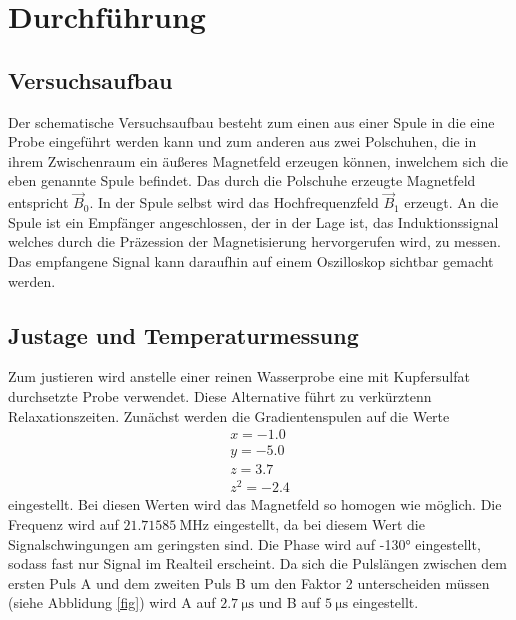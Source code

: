 \section{Durchführung}
\label{sec:Durchführung}

\subsection{Versuchsaufbau}
\label{sec:Versuchsaufbau}

Der schematische Versuchsaufbau besteht zum einen aus einer Spule in die eine Probe 
eingeführt 
werden kann und zum anderen aus zwei Polschuhen, die in ihrem Zwischenraum ein 
äußeres Magnetfeld erzeugen können, inwelchem sich die eben genannte Spule befindet. 
Das durch die Polschuhe erzeugte Magnetfeld entspricht $\vec{B}_{\text{0}}$.
In der Spule selbst wird das Hochfrequenzfeld $\vec{B}_{\text{1}}$ erzeugt.
An die Spule ist ein Empfänger angeschlossen, der in der Lage ist, das Induktionssignal 
welches durch die Präzession der Magnetisierung hervorgerufen wird, zu messen.
Das empfangene Signal kann daraufhin auf einem Oszilloskop sichtbar gemacht werden.

\subsection{Justage und Temperaturmessung}
\label{sec:Justage}

Zum justieren wird anstelle einer reinen Wasserprobe eine mit Kupfersulfat 
durchsetzte Probe verwendet. Diese Alternative führt zu verkürztenn Relaxationszeiten.
Zunächst werden die Gradientenspulen auf die Werte
\begin{align}
    x = -1.0\\
    y = -5.0\\
    z = 3.7\\
    z^2 = -2.4
\end{align}
eingestellt. Bei diesen Werten wird das Magnetfeld so homogen wie möglich.
Die Frequenz wird auf $\SI{21,71585}{\mega\hertz}$ eingestellt,
da bei diesem Wert die Signalschwingungen am geringsten sind. Die Phase wird auf 
-130° eingestellt, sodass fast nur Signal im Realteil erscheint.
Da sich die Pulslängen zwischen dem ersten Puls A und dem zweiten Puls B 
um den Faktor 2 unterscheiden müssen (siehe Abblidung \ref{fig}) wird A auf 
$\SI{2,7}{\micro\second}$ und B auf $\SI{5}{\micro\second}$ eingestellt.
